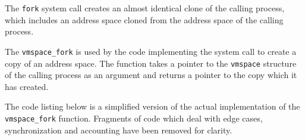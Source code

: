 \documentclass[shortabstract, english]{iithesis}
\begin{document}
The \texttt{fork} system call creates an almost identical clone of the calling
process, which includes an address space cloned from the address space of the
calling process.

The \texttt{vmspace_fork} is used by the code
implementing the system call to create a copy of an address space.
The function takes a pointer to the \texttt{vmspace} structure of the
calling process as an argument and returns a pointer to the copy which it has
created.

The code listing below is a simplified version of the actual implementation of
the \texttt{vmspace_fork} function. Fragments of code which deal with
edge cases, synchronization and accounting have been removed for clarity.

\end{document}
